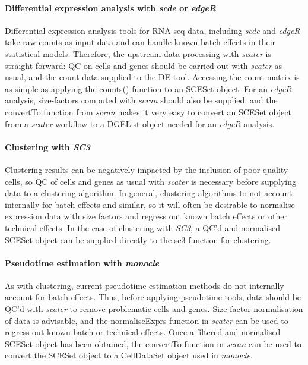 \documentclass{revtex4}
\begin{document}
\paragraph{Differential expression analysis with \emph{scde} or \emph{edgeR}} Differential expression analysis tools for RNA-seq data, including \emph{scde} and \emph{edgeR} take raw counts as input data and can handle known batch effects in their statistical models. Therefore, the upstream data processing with \emph{scater} is straight-forward: QC on cells and genes should be carried out with \emph{scater} as usual, and the count data supplied to the DE tool. Accessing the count matrix is as simple as applying the counts() function to an SCESet object. For an \emph{edgeR} analysis, size-factors computed with \emph{scran} should also be supplied, and the convertTo function from \emph{scran} makes it very easy to convert an SCESet object from a \emph{scater} workflow to a DGEList object needed for an \emph{edgeR} analysis.

\paragraph{Clustering with \emph{SC3}} Clustering results can be negatively impacted by the inclusion of poor quality cells, so QC of cells and genes as usual with \emph{scater} is necessary before supplying data to a clustering algorithm. In general, clustering algorithms to not account internally for batch effects and similar, so it will often be desirable to normalise expression data with size factors and regress out known batch effects or other technical effects. In the case of clustering with \emph{SC3}, a QC'd and normalised SCESet object can be supplied directly to the sc3 function for clustering.

\paragraph{Pseudotime estimation with \emph{monocle}} As with clustering, current pseudotime estimation methods do not internally account for batch effects. Thus, before applying pseudotime tools, data should be QC'd with \emph{scater} to remove problematic cells and genes. Size-factor normalisation of data is advisable, and the normaliseExprs function in \emph{scater} can be used to regress out known batch or technical effects. Once a filtered and normalised SCESet object has been obtained, the convertTo function in \emph{scran} can be used to convert the SCESet object to a CellDataSet object used in \emph{monocle}.
\end{document}
